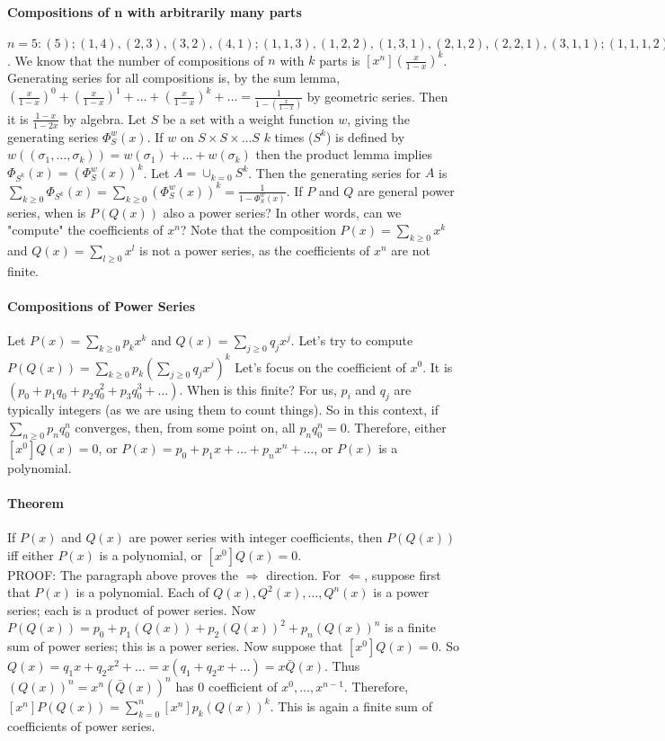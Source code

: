 \documentclass[10pt,letter]{article}
\begin{document}
\paragraph{Compositions of n with arbitrarily many parts}
$n=5:(5);(1,4),(2,3),(3,2),(4,1);(1,1,3),(1,2,2),(1,3,1),(2,1,2),(2,2,1),(3,1,1);(1,1,1,2),(1,1,2,1),(1,2,1,1),(2,1,1,1);(1,1,1,1,1)$. We know that the number of compositions of $n$ with $k$ parts is $[x^n]\left(\frac{x}{1-x}\right)^k$. Generating series for all compositions is, by the sum lemma, $\left(\frac{x}{1-x}\right)^0+\left(\frac{x}{1-x}\right)^1+\ldots+\left(\frac{x}{1-x}\right)^k+\ldots=\frac{1}{1-\left(\frac{x}{1-x}\right)}$ by geometric series. Then it is $\frac{1-x}{1-2x}$ by algebra. Let $S$ be a set with a weight function $w$, giving the generating series $\Phi_S^w(x)$. If $w$ on $S\times S\times\ldots S$ $k$ times ($S^k$) is defined by $w((\sigma_1,\ldots,\sigma_k))=w(\sigma_1)+\ldots+w(\sigma_k)$ then the product lemma implies $\Phi_{S^k}(x)=\left(\Phi_S^w(x)\right)^k$. Let $A=\cup_{k=0}S^k$. Then the generating series for $A$ is $\sum_{k\geq0}\Phi_{S^k}(x)=\sum_{k\geq0}\left(\Phi_S^w(x)\right)^k=\frac{1}{1-\Phi_S^w(x)}$. If $P$ and $Q$ are general power series, when is $P(Q(x))$ also a power series? In other words, can we "compute" the coefficients of $x^n$? Note that the composition $P(x)=\sum_{k\geq0}x^k$ and $Q(x)=\sum_{l\geq0}x^l$ is not a power series, as the coefficients of $x^n$ are not finite. 
\paragraph{Compositions of Power Series}
Let $P(x)=\sum_{k\geq0}p_kx^k$ and $Q(x)=\sum_{j\geq0}q_jx^j$. Let's try to compute $P(Q(x))=\sum_{k\geq0}p_k\left(\sum_{j\geq0}q_jx^j\right)^k$ Let's focus on the coefficient of $x^0$. It is $(p_0+p_1q_0+p_2q_0^2+p_3q_0^3+\ldots)$. When is this finite? For us, $p_i$ and $q_j$ are typically integers (as we are using them to count things). So in this context, if $\sum_{n\geq0}p_nq_0^n$ converges, then, from some point on, all $p_nq_0^n=0$. Therefore, either $[x^0]Q(x)=0$, or $P(x)=p_0+p_1x+\ldots+p_nx^n+\ldots$, or $P(x)$ is a polynomial. 
\paragraph{Theorem} 
If $P(x)$ and $Q(x)$ are power series with integer coefficients, then $P(Q(x))$ iff either $P(x)$ is a polynomial, or $[x^0]Q(x)=0$. \\ 
PROOF: The paragraph above proves the $\Rightarrow$ direction. For $\Leftarrow$, suppose first that $P(x)$ is a polynomial. Each of $Q(x),Q^2(x),\ldots,Q^n(x)$ is a power series; each is a product of power series. Now $P(Q(x))=p_0+p_1(Q(x))+p_2(Q(x))^2+p_n(Q(x))^n$ is a finite sum of power series; this is a power series. Now suppose that $[x^0]Q(x)=0$. So $Q(x)=q_1x+q_2x^2+\ldots=x(q_1+q_2x+\ldots)=x\bar{Q}(x)$. Thus $(Q(x))^n=x^n(\bar{Q}(x))^n$ has 0 coefficient of $x^0,\ldots,x^{n-1}$. Therefore, $[x^n]P(Q(x))=\sum_{k=0}^n[x^n]p_k(Q(x))^k$. This is again a finite sum of coefficients of power series. 
\end{document}

